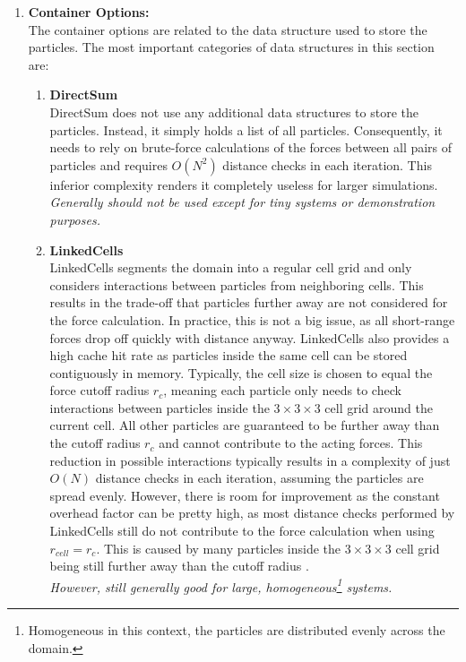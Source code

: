 \begin{enumerate}[label=\textbf{\arabic*.}]
      \item \textbf{Container Options:} \\
            The container options are related to the data structure used to store the particles. The most important categories of data structures in this section are:
            \begin{enumerate}
                  \item \textbf{DirectSum} \\
                        DirectSum does not use any additional data structures to store the particles. Instead, it simply holds a list of all particles. Consequently, it needs to rely on brute-force calculations of the forces between all pairs of particles and requires $O(N^2)$ distance checks in each iteration. This inferior complexity renders it completely useless for larger simulations.\\
                        \textit{Generally should not be used except for tiny systems or demonstration purposes.~\cite{VICCIONE2008625}}
                  \item \textbf{LinkedCells} \\
                        LinkedCells segments the domain into a regular cell grid and only considers interactions between particles from neighboring cells. This results in the trade-off that particles further away are not considered for the force calculation. In practice, this is not a big issue, as all short-range forces drop off quickly with distance anyway.
                        LinkedCells also provides a high cache hit rate as particles inside the same cell can be stored contiguously in memory. Typically, the cell size is chosen to equal the force cutoff radius $r_c$, meaning each particle only needs to check interactions between particles inside the $3\times3\times3$ cell grid around the current cell. All other particles are guaranteed to be further away than the cutoff radius $r_c$ and cannot contribute to the acting forces.
                        This reduction in possible interactions typically results in a complexity of just $O(N)$ distance checks in each iteration, assuming the particles are spread evenly. However, there is room for improvement as the constant overhead factor can be pretty high, as most distance checks performed by LinkedCells still do not contribute to the force calculation when using $r_{cell}=r_c$. This is caused by many particles inside the $3\times3\times3$ cell grid being still further away than the cutoff radius \cite{GRATL2019748}.\\
                        \textit{However, still generally good for large, homogeneous\footnote{Homogeneous in this context, the particles are distributed evenly across the domain.} systems.}


\end{enumerate}
\end{enumerate}
